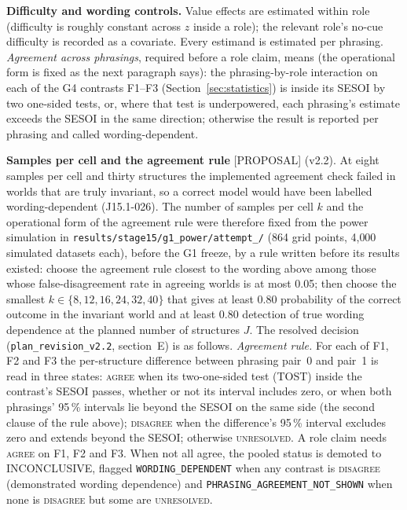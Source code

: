 \documentclass[10pt,a4paper]{article}
\newcommand{\tg}[1]{\textsc{[#1]}}
\begin{document}
\textbf{Difficulty and wording controls.} Value effects are estimated within role (difficulty is roughly constant
across $z$ inside a role); the relevant role's no-cue difficulty is recorded as a covariate. Every estimand is
estimated per phrasing. \emph{Agreement across phrasings}, required before a role claim, means (the operational form is fixed as the next paragraph says): the
phrasing-by-role interaction on each of the G4 contrasts F1--F3 (Section~\ref{sec:statistics}) is inside its SESOI by two one-sided tests, or, where that test is
underpowered, each phrasing's estimate exceeds the SESOI in the same direction; otherwise the result is reported
per phrasing and called wording-dependent.

\textbf{Samples per cell and the agreement rule} \tg{PROPOSAL} (v2.2). At eight samples per cell and thirty structures
the implemented agreement check failed in worlds that are truly invariant, so a correct model would have been
labelled wording-dependent (J15.1-026). The number of samples per cell $k$ and the operational form of the agreement
rule were therefore fixed from the power simulation in \texttt{results/\allowbreak stage15/\allowbreak g1\_\allowbreak power/\allowbreak attempt\_/} (864 grid points, 4{,}000 simulated datasets each), before the G1
freeze, by a rule written before its results existed: choose the agreement rule closest to the wording above among those
whose false-disagreement rate in agreeing worlds is at most 0.05; then choose the smallest $k\in\{8,12,16,24,32,40\}$
that gives at least 0.80 probability of the correct outcome in the invariant world and at least 0.80 detection of true
wording dependence at the planned number of structures $J$. The resolved decision
(\texttt{plan\_revision\_v2.2}, section~E) is as follows.
\emph{Agreement rule.} For each of F1, F2 and F3 the per-structure difference between phrasing pair~0 and pair~1 is
read in three states: \textsc{agree} when its two-one-sided test (TOST) inside the contrast's SESOI passes, whether or not its interval includes zero,
or when both phrasings' 95\,\% intervals lie beyond the SESOI on the same side (the second clause of the rule above);
\textsc{disagree} when the difference's 95\,\% interval excludes zero and extends beyond the SESOI; otherwise
\textsc{unresolved}. A role claim needs \textsc{agree} on F1, F2 and F3. When not all agree, the pooled status is demoted
to INCONCLUSIVE, flagged \texttt{WORDING\_DEPENDENT} when any contrast is \textsc{disagree} (demonstrated wording
dependence) and \texttt{PHRASING\_AGREEMENT\_NOT\_SHOWN} when none is \textsc{disagree} but some are \textsc{unresolved}.
\end{document}
